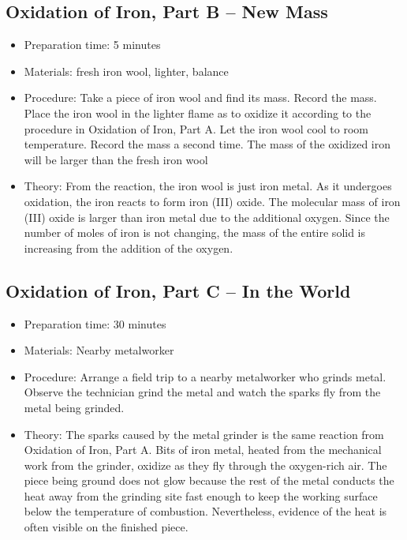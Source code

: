 \subsection{Oxidation of Iron, Part B – New Mass}
\begin{itemize}
\item{Preparation time: 5 minutes}
\item{Materials: fresh iron wool, lighter, balance}
\item{Procedure: Take a piece of iron wool and find its mass. Record the mass. Place the iron wool in the lighter flame as to oxidize it according to the procedure in Oxidation of Iron, Part A. Let the iron wool cool to room temperature. Record the mass a second time. The mass of the oxidized iron will be larger than the fresh iron wool}
\item{Theory: From the reaction, the iron wool is just iron metal. As it undergoes oxidation, the iron reacts to form iron (III) oxide. The molecular mass of iron (III) oxide is larger than iron metal due to the additional oxygen. Since the number of moles of iron is not changing, the mass of the entire solid is increasing from the addition of the oxygen.}
\end{itemize}

\subsection{Oxidation of Iron, Part C – In the World}
\begin{itemize}
\item{Preparation time: 30 minutes}
\item{Materials: Nearby metalworker}
\item{Procedure: Arrange a field trip to a nearby metalworker who grinds metal. Observe the technician grind the metal and watch the sparks fly from the metal being grinded. }
\item{Theory: The sparks caused by the metal grinder is the same reaction from Oxidation of Iron, Part A. Bits of iron metal, heated from the mechanical work from the grinder, oxidize as they fly through the oxygen-rich air. The piece being ground does not glow because the rest of the metal conducts the heat away from the grinding site fast enough to keep the working surface below the temperature of combustion. Nevertheless, evidence of the heat is often visible on the finished piece.}
\end{itemize}

